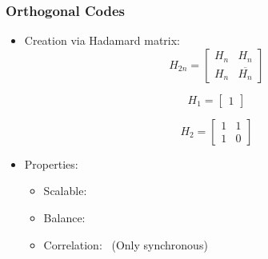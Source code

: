 \documentclass{beamer}
\newcommand{\cmark}{\ding{51}}%
\newcommand{\xmark}{\ding{55}}%
\begin{document}
	\begin{frame}\frametitle{Orthogonal Codes}
		\begin{itemize}

			\item Creation via Hadamard matrix: 
			\begin{equation*}
				H_{2n} = 
				\begin{bmatrix} 
					H_n & H_n \\ 
					H_n & \overline{H_n} 
				\end{bmatrix}
			\end{equation*}


			\noindent
			\begin{minipage}{.5\linewidth}
				\begin{equation*}
					H_{1} = 
					\begin{bmatrix} 
						1
					\end{bmatrix}
				\end{equation*}
			\end{minipage}%
			\begin{minipage}{.5\linewidth}
				\begin{equation*}
					H_{2} = 
					\begin{bmatrix} 
						1 & 1 \\ 
						1 & 0
					\end{bmatrix}
				\end{equation*}
			\end{minipage}

	
			\item Properties:
				\begin{itemize}


				\item Scalable: \cmark

				\item Balance: \xmark

				\item Correlation: \cmark  \  (Only synchronous)

				

			\end{itemize}


		\end{itemize}
		

	\end{frame}



\end{document}
